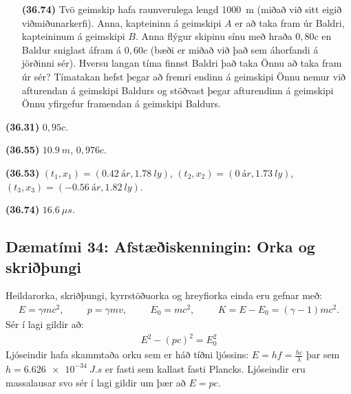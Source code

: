 \ifdefined \wholebook \else\documentclass[oneside]{book}\usepackage{EdlBook}\graphicspath{{figures/}}
\begin{document}
\begin{enumerate}[label = \textbf{(\alph*)}]
\item[\textbf{(36.74)}] Tvö geimskip hafa raunverulega lengd \SI{1000}{m} (miðað við sitt eigið viðmiðunarkerfi). Anna, kapteininn á geimskipi $A$ er að taka fram úr Baldri, kapteininum á geimskipi $B$. Anna flýgur skipinu sínu með hraða $0,80c$ en Baldur sniglast áfram á $0,60c$ (bæði er miðað við það sem áhorfandi á jörðinni sér). Hversu langan tíma finnst Baldri það taka Önnu að taka fram úr sér? Tímatakan hefst þegar að fremri endinn á geimskipi Önnu nemur við afturendan á geimskipi Baldurs og stöðvast þegar afturendinn á geimskipi Önnu yfirgefur framendan á geimskipi Baldurs.

\end{enumerate}

\begin{tcolorbox}
\begin{enumerate*}[label = ]
  \item \textbf{(36.31)} $0,95c$.
  \item \textbf{(36.55)} $\SI{10.9}{m}$, $0,976c$.
  \item \textbf{(36.53)} $(t_1,x_1) = (\SI{0.42}{ár}, \SI{1.78}{ly})$,  $(t_2,x_2) = (\SI{0}{ár}, \SI{1.73}{ly})$, $(t_3,x_3) = (-\SI{0.56}{ár}, \SI{1.82}{ly})$.
  \item \textbf{(36.74)} $\SI{16.6}{\mu s}$.
\end{enumerate*}
\end{tcolorbox}

\newpage

\subsection*{Dæmatími 34: Afstæðiskenningin: Orka og skriðþungi}

\begin{tcolorbox}
Heildarorka, skriðþungi, kyrrstöðuorka og hreyfiorka einda eru gefnar með:
\begin{align*}
    E = \gamma mc^2, \hspace{1cm} p = \gamma mv, \hspace{1cm} E_0 = mc^2, \hspace{1cm} K = E-E_0 = (\gamma -1)mc^2.
\end{align*}
Sér í lagi gildir að:
\begin{align*}
    E^2 - (pc)^2 = E_0^2
\end{align*}
Ljóseindir hafa skammtaða orku sem er háð tíðni ljóssins: $E = hf = \frac{hc}{\lambda}$ þar sem $h = \SI{6.626e-34}{J.s}$ er fasti sem kallast fasti Plancks. Ljóseindir eru massalausar svo sér í lagi gildir um þær að $E = pc$.
\end{tcolorbox}
\end{document}

